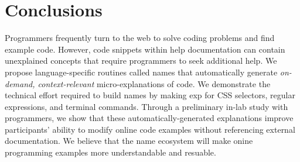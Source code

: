 \section{Conclusions}

Programmers frequently turn to the web to solve coding problems and find example code.
However, code snippets within  help documentation can contain unexplained concepts that require programmers to seek additional help.
We propose language-specific routines called \glspl{name} that automatically generate \emph{on-demand, context-relevant} micro-explanations of code.
We demonstrate the technical effort required to build \glspl{name} by making \gls{exp} for CSS selectors, regular expressions, and terminal commands.
Through a preliminary in-lab study with programmers, we show that these automatically-generated explanations improve participants' ability to modify online code examples without referencing external documentation.
We believe that the \gls{name} ecosystem will make onine programming examples more understandable and resuable.
